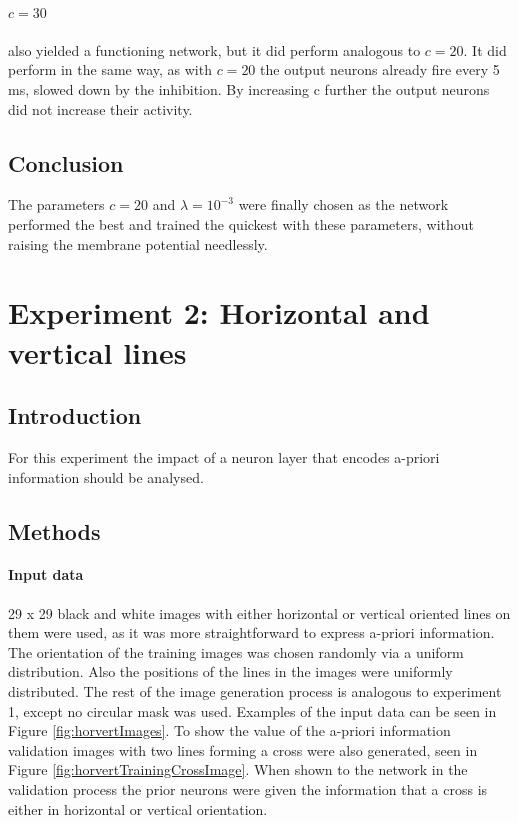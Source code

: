 \paragraph{$c = 30$}
also yielded a functioning network, but it did perform analogous to $c = 20$. It did perform in the same way, as with $c = 20$ the output neurons already fire every 5 ms, slowed down by the inhibition. By increasing c further the output neurons did not increase their activity.

\subsection{Conclusion}

The parameters $c = 20$ and $\lambda = 10^{-3}$ were finally chosen as the network performed the best and trained the quickest with these parameters, without raising the membrane potential needlessly.

\section{Experiment 2: Horizontal and vertical lines}
\label{section:horvert}

\subsection{Introduction}

For this experiment the impact of a neuron layer that encodes a-priori information should be analysed.

\subsection{Methods}

\paragraph{Input data}
29 x 29 black and white images with either horizontal or vertical oriented lines on them were used, as it was more straightforward to express a-priori information. The orientation of the training images was chosen randomly via a uniform distribution. Also the positions of the lines in the images were uniformly distributed. The rest of the image generation process is analogous to experiment 1, except no circular mask was used. Examples of the input data can be seen in Figure \ref{fig:horvertImages}. To show the value of the a-priori information validation images with two lines forming a cross were also generated, seen in Figure \ref{fig:horvertTrainingCrossImage}. When shown to the network in the validation process the prior neurons were given the information that a cross is either in horizontal or vertical orientation.

